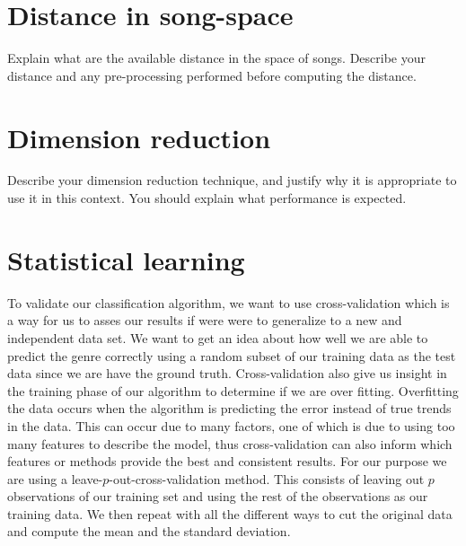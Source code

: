 \documentclass[12pt]{article}
\begin{document}
\section{Distance in song-space}
Explain what are the available distance in the space of songs.
Describe your distance and any pre-processing performed before
computing the distance.
\section{Dimension reduction}
Describe your dimension reduction technique, and justify why it 
is appropriate to use it in this context. You should explain what 
performance is expected.
\section{Statistical learning}
To validate our classification algorithm, we want to use cross-validation which is a way for us to asses our results if were were to generalize to a new and independent data set. We want to get an idea about how well we are able to predict the genre correctly using a random subset of our training data as the test data since we are have the ground truth. Cross-validation also give us insight in the training phase of our algorithm to determine if we are over fitting. Overfitting the data occurs when the algorithm is predicting the error instead of true trends in the data. This can occur due to many factors, one of which is due to using too many features to describe the model, thus cross-validation can also inform which features or methods provide the best and consistent results. For our purpose we are using a leave-$p$-out-cross-validation method. This consists of leaving out $p$ observations of our training set and using the rest of the observations as our training data. We then repeat with all the different ways to cut the original data and compute the mean and the standard deviation. 

\end{document}
